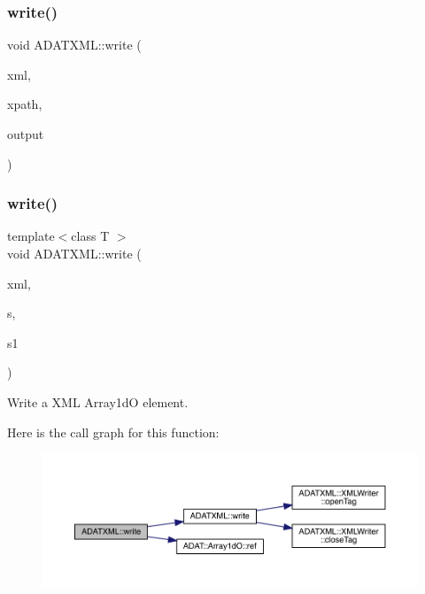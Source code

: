 \mbox{\label{group__io_gaae1762f924e581123d4df61dff9b9f5b}} 
\subsubsection{\texorpdfstring{write()}{write()}\hspace{0.1cm}{\footnotesize\ttfamily [23/58]}}
{\footnotesize\ttfamily void A\+D\+A\+T\+X\+M\+L\+::write (\begin{DoxyParamCaption}\item[{\mbox{\hyperlink{classADATXML_1_1XMLWriter}{X\+M\+L\+Writer}} \&}]{xml,  }\item[{const std\+::string \&}]{xpath,  }\item[{const \mbox{\hyperlink{classXMLArray_1_1Array}{Array}}$<$ unsigned short int $>$ \&}]{output }\end{DoxyParamCaption})}

\mbox{\label{group__io_ga4aca42ea47cabf4b5644cf09729343ce}} 
\subsubsection{\texorpdfstring{write()}{write()}\hspace{0.1cm}{\footnotesize\ttfamily [24/58]}}
{\footnotesize\ttfamily template$<$class T $>$ \\
void A\+D\+A\+T\+X\+M\+L\+::write (\begin{DoxyParamCaption}\item[{\mbox{\hyperlink{classADATXML_1_1XMLWriter}{X\+M\+L\+Writer}} \&}]{xml,  }\item[{const std\+::string \&}]{s,  }\item[{const \mbox{\hyperlink{classADAT_1_1Array1dO}{A\+D\+A\+T\+::\+Array1dO}}$<$ T $>$ \&}]{s1 }\end{DoxyParamCaption})\hspace{0.3cm}{\ttfamily [inline]}}



Write a X\+ML Array1dO element. 

Here is the call graph for this function\+:\nopagebreak
\begin{figure}[H]
\begin{center}
\leavevmode
\includegraphics[width=350pt]{d2/da3/group__io_ga4aca42ea47cabf4b5644cf09729343ce_cgraph}
\end{center}
\end{figure}
\mbox{\label{group__io_gaa86792c3bbc86036087623eee8f75f15}} 
